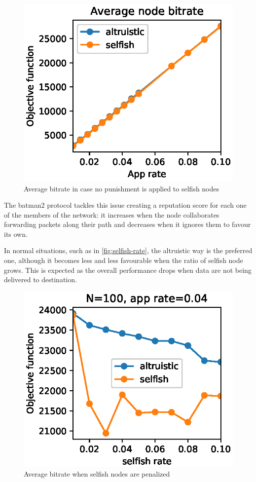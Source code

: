 \documentclass[conference,10.5pt]{IEEEtran}
\begin{document}
\begin{figure}[h]
  \includegraphics{figures/obj_func_vs_app_rate_no_punish.eps}
  \caption{Average bitrate in case no punishment is applied to selfish nodes}
  \label{fig:no-blame-app-rate}
\end{figure}

The \gls{batman2} protocol tackles this issue creating a reputation score for each one of the members of the network: it increases when the node collaborates forwarding packets along their path and decreases when it ignores them to favour its own.

In normal situations, such as in \autoref{fig:selfish-rate}, the altruistic way is the preferred one, although it becomes less and less favourable when the ratio of selfish node grows. This is expected as the overall performance drops when data are not being delivered to destination.

\begin{figure}[h]
  \includegraphics{figures/obj_func_vs_selfish_rate_selfish_degrade.eps}
  \caption{Average bitrate when selfish nodes are penalized}
  \label{fig:selfish-rate}
\end{figure}
\end{document}
